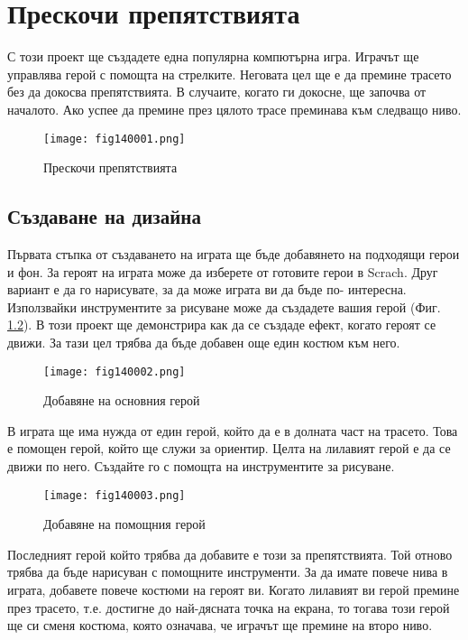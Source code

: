 \chapter{Прескочи препятствията}

С този проект ще създадете една популярна компютърна игра. Играчът ще управлява герой с помощта на стрелките. Неговата цел ще е да премине трасето без да докосва препятствията. В случаите, когато ги докосне, ще започва от началото. Ако успее да премине през цялото трасе преминава към следващо ниво.

\begin{figure}[H]
  \centering
  \texttt{[image: fig140001.png]}
  \caption{Прескочи препятствията}
\label{fig140001}
\end{figure}

\section{Създаване на дизайна}
Първата стъпка от създаването на играта ще бъде добавянето на подходящи герои и фон. За героят на играта може да изберете от готовите герои в Scrach. Друг вариант е да го нарисувате, за да може играта ви да бъде по- интересна. Използвайки инструментите за рисуване може да създадете вашия герой (Фиг. \ref{fig140002}). В този проект ще демонстрира как да се създаде ефект, когато героят се движи. За тази цел трябва да бъде добавен още един костюм към него.

\begin{figure}[H]
  \centering
  \texttt{[image: fig140002.png]}
  \caption{Добавяне на основния герой}
\label{fig140002}
\end{figure}

В играта ще има нужда от един герой, който да е в долната част на трасето. Това е помощен герой, който ще служи за ориентир. Целта на лилавият герой е да се движи по него. Създайте го с помощта на инструментите за рисуване.

\begin{figure}[H]
  \centering
  \texttt{[image: fig140003.png]}
  \caption{Добавяне на помощния герой}
\label{fig140003}
\end{figure}

Последният герой който трябва да добавите е този за препятствията. Той отново трябва да бъде нарисуван с помощните инструменти. За да имате повече нива в играта, добавете повече костюми на героят ви. Когато лилавият ви герой премине през трасето, т.е. достигне до най-дясната точка на екрана, то тогава този герой ще си сменя костюма, която означава, че играчът ще премине на второ ниво.

